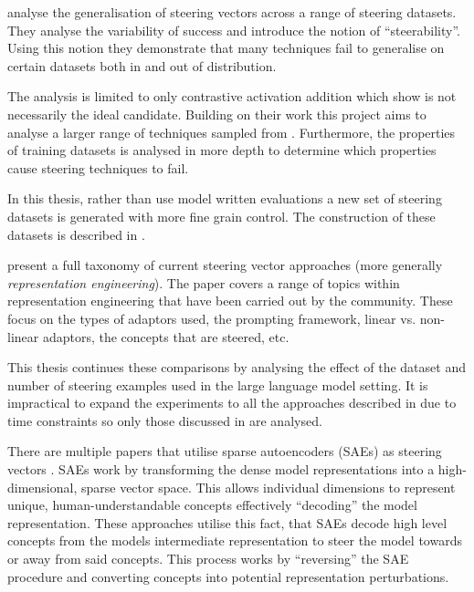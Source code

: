 analyse the generalisation of steering vectors across a range of steering datasets.
They analyse the variability of success and introduce the notion of ``steerability''.
Using this notion they demonstrate that many techniques fail to generalise on certain datasets both in and out of distribution.

The analysis is limited to only contrastive activation addition \citep{caa} which \citet{steering-clear} show is not necessarily the ideal candidate.
Building on their work this project aims to analyse a larger range of techniques sampled from \citet{steering-clear}.
Furthermore, the properties of training datasets is analysed in more depth to determine which properties cause steering techniques to fail.

In this thesis, rather than use model written evaluations \citep{mwe} a new set of steering datasets is generated with more fine grain control.
The construction of these datasets is described in .

present a full taxonomy of current steering vector approaches (more generally \emph{representation engineering}).
The paper covers a range of topics within representation engineering that have been carried out by the community.
These focus on the types of adaptors used, the prompting framework, linear vs. non-linear adaptors, the concepts that are steered, etc.

This thesis continues these comparisons by analysing the effect of the dataset and number of steering examples used in the large language model setting.
It is impractical to expand the experiments to all the approaches described in \citet{steering-taxonomy} due to time constraints so only those discussed in \citet{steering-clear} are analysed.


There are multiple papers that utilise sparse autoencoders (SAEs) as steering vectors \citep{sae-improved, sae-steering, icl-sae}.
SAEs work by transforming the dense model representations into a high-dimensional, sparse vector space.
This allows individual dimensions to represent unique, human-understandable concepts effectively ``decoding'' the model representation.
These approaches utilise this fact, that SAEs decode high level concepts from the models intermediate representation to steer the model towards or away from said concepts.
This process works by ``reversing'' the SAE procedure and converting concepts into potential representation perturbations.

